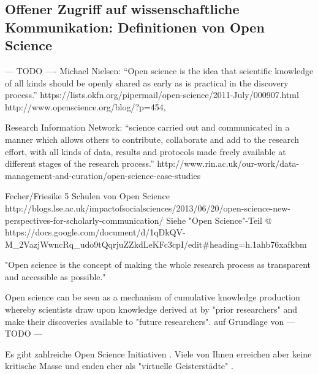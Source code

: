 \subsection{Offener Zugriff auf wissenschaftliche Kommunikation: Definitionen von Open Science}
--- TODO ---- Michael Nielsen: “Open science is the idea that scientific knowledge of all kinds should be openly shared as early as is practical in the discovery process.”  https://lists.okfn.org/pipermail/open-science/2011-July/000907.html
http://www.openscience.org/blog/?p=454,

Research Information Network: “science carried out and communicated in a manner which allows others to contribute, collaborate and add to the research effort, with all kinds of data, results and protocols made freely available at different stages of the research process.” http://www.rin.ac.uk/our-work/data-management-and-curation/open-science-case-studies

Fecher/Friesike 5 Schulen von Open Science http://blogs.lse.ac.uk/impactofsocialsciences/2013/06/20/open-science-new-perspectives-for-scholarly-communication/
Siehe "Open Science"-Teil @ https://docs.google.com/document/d/1qDkQV-M_2VazjWwncRq_udo9tQqrjuZZkdLeKFc3cpI/edit#heading=h.1ahb76xafkbm

"Open science is the concept of making the whole research process as transparent and accessible as possible."\cite{Scheliga_2014}

Open science can be seen as a mechanism of cumulative knowledge production whereby scientists draw upon knowledge derived at by "prior researchers" and make their discoveries available to "future researchers". \cite{Scheliga_2014} auf Grundlage von \cite{Mukherjee_2009}
--- TODO ---

Es gibt zahlreiche Open Science Initiativen \cite{Scheliga_2014}. Viele von Ihnen erreichen aber keine kritische Masse \cite{wrap_2010} und enden eher als "virtuelle Geisterstädte" \cite{Nielsen_2011}.

